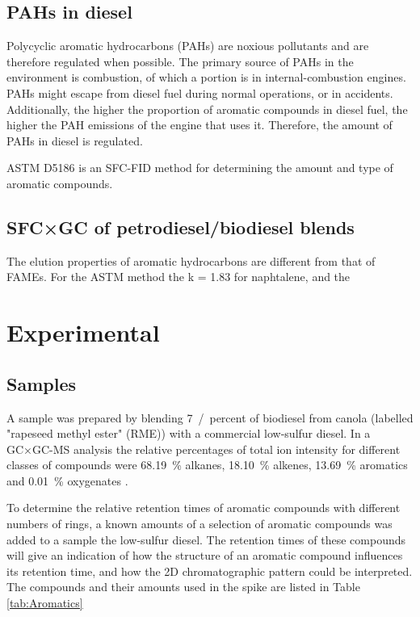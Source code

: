 \subsection{PAHs in diesel} 

Polycyclic aromatic hydrocarbons (PAHs) are noxious pollutants and are therefore
regulated when possible. The primary source of PAHs in the environment is
combustion, of which a portion is in internal-combustion engines.  PAHs might
escape from diesel fuel during normal operations, or in accidents. Additionally,
the higher the proportion of aromatic compounds in diesel fuel, the higher the
PAH emissions of the engine that uses it. Therefore, the amount of PAHs in
diesel is regulated.

ASTM D5186 \autocite{ASTMD5186} is an SFC-FID method for determining the amount
and type of aromatic compounds. 

\subsection{SFC×GC of petrodiesel/biodiesel blends}

The elution properties of aromatic hydrocarbons are different from that of FAMEs. For the ASTM method the k = \num{1.83} for naphtalene, and the 


\section{Experimental}

\subsection{Samples} 

A sample was prepared by blending \SI{7}{/percent} of biodiesel from canola
(labelled "rapeseed methyl ester" (RME)) with a commercial low-sulfur diesel. In a
GC×GC-MS analysis the relative percentages of total ion intensity for different
classes of compounds were \SI{68.19}{\percent} alkanes, \SI{18.10}{\percent}
alkenes, \SI{13.69}{\percent} aromatics and \SI{0.01}{\percent} oxygenates
\autocite{Smit2015}.

To determine the relative retention times of aromatic compounds with different
numbers of rings, a known amounts of a selection of aromatic compounds was added
to a sample the low-sulfur diesel. The retention times of these 
compounds will give an indication of how the structure of an aromatic compound
influences its retention time, and how the 2D chromatographic pattern could be
interpreted. The compounds and their amounts used in the spike are listed in
Table \ref{tab:Aromatics}


